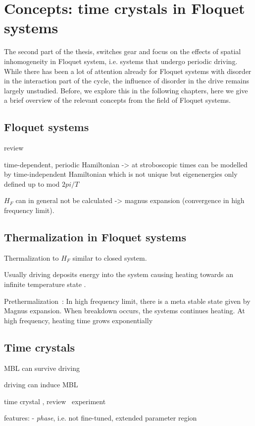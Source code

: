 \chapter{Concepts: time crystals in Floquet systems}\label{ch:introduction-floquet}

The second part of the thesis, switches gear and focus on the effects of spatial inhomogeneity in Floquet system, i.e. systems that undergo periodic driving. While there has been a lot of attention already for Floquet systems with disorder in the interaction part of the cycle, the influence of disorder in the drive remains largely unstudied. Before, we explore this in the following chapters, here we give a brief overview of the relevant concepts from the field of Floquet systems.

\section{Floquet systems}
review~\cite{eckardtColloquiumAtomicQuantum2017}

time-dependent, periodic Hamiltonian -> at stroboscopic times can be modelled by time-independent Hamiltonian which is not unique but eigenenergies only defined up to mod $2pi/T$

$H_F$ can in general not be calculated -> magnus expansion (convergence in high frequency limit). 


\section{Thermalization in Floquet systems}

Thermalization to $H_F$ similar to closed system.

Usually driving deposits energy into the system causing heating towards an infinite temperature state \cite{dalessioLongtimeBehaviorIsolated2014,bukovUniversalHighfrequencyBehavior2015}.

Prethermalization~\cite{moriThermalizationPrethermalizationIsolated2018}: In high frequency limit, there is a meta stable state given by Magnus expansion. When breakdown occurs, the systems continues heating. At high frequency, heating time grows exponentially~\cite{kuwaharaFloquetMagnusTheory2016,abaninRigorousTheoryManyBody2017,moriThermalizationPrethermalizationIsolated2018}

\section{Time crystals}

MBL can survive driving \cite{abaninTheoryManybodyLocalization2016,burauFateAlgebraicManybody2021,sierantStabilityManybodyLocalization2023}

driving can induce MBL \cite{choiDynamicallyInducedManybody2018}

time crystal \cite{vonkeyserlingkAbsoluteStabilitySpatiotemporal2016,elsePrethermalPhasesMatter2017}, review~\cite{khemaniBriefHistoryTime2019,elseDiscreteTimeCrystals2020a}
experiment~\cite{choiObservationDiscreteTimecrystalline2017}

features:
 - \emph{phase}, i.e. not fine-tuned, extended parameter region